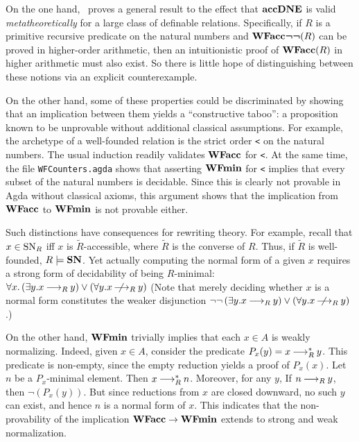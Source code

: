 On the one hand,~\cite{Berardi} proves a general result to the effect that
$\mathbf{accDNE}$ is valid \emph{metatheoretically} for a large class of definable relations.
Specifically, if $R$ is a primitive recursive predicate on the natural numbers and
$\mathbf{WFacc}\boldsymbol{\lnot\lnot}(R)$ can be proved in higher-order arithmetic, then an intuitionistic proof
of $\mathbf{WFacc}(R)$ in higher arithmetic must also exist.
So there is little hope of distinguishing between these notions via an explicit counterexample.

On the other hand, some of these properties could be discriminated
by showing that an implication between them yields a ``constructive taboo'':
a proposition known to be unprovable without additional classical assumptions.
For example, the archetype of a well-founded relation is the strict order \verb|<|
on the natural numbers.  The usual induction readily validates $\mathbf{WFacc}$ for \verb|<|.
  At the same time, the file \texttt{WFCounters.agda} shows that
asserting $\mathbf{WFmin}$ for \verb|<| implies that every subset of the natural numbers is decidable.
Since this is clearly not provable in Agda without classical axioms,
this argument shows that the implication from $\mathbf{WFacc}$ to $\mathbf{WFmin}$ is not provable either.

Such distinctions have consequences for rewriting theory.
For example, recall that $x\in \mathrm{SN}_R$ iff $x$ is $\tilde{R}$-accessible, where $\tilde{R}$
is the converse of $R$.  Thus, if $\tilde{R}$ is well-founded, $R \models \mathbf{SN}$.
Yet actually computing the normal form of a given $x$ requires a
strong form of decidability of being $R$-minimal:
$\forall x. \left(\exists y. x \mathbin{\longrightarrow_R} y \right) \lor \left(\forall y. x \mathbin{\,\,\not \!\!\!\! \mathbin{\longrightarrow_R}} y\right)$
(Note that merely deciding whether $x$ is a normal form constitutes the weaker disjunction
$\lnot\lnot\left(\exists y. x \mathbin{\longrightarrow_R} y\right) \lor \left(\forall y. x \mathbin{\,\,\not \!\!\!\! \mathbin{\longrightarrow_R}} y\right)$.)

On the other hand, $\mathbf{WFmin}$ trivially implies that each $x \in A$ is weakly normalizing.
Indeed, given $x \in A$, consider the predicate $P_x(y) = x \mathbin{\longrightarrow_R^*} y$.
This predicate is non-empty, since the empty reduction yields a proof of $P_x(x)$.
Let $n$ be a $P_x$-minimal element.  Then $x \mathbin{\longrightarrow_R^*} n$.  Moreover, for any $y$,
If $n \mathbin{\longrightarrow_R} y$, then $\lnot(P_x(y))$.  But since reductions from $x$ are closed downward,
no such $y$ can exist, and hence $n$ is a normal form of $x$.
This indicates that the non-provability of the implication $\mathbf{WFacc} \to \mathbf{WFmin}$ extends
to strong and weak normalization.

